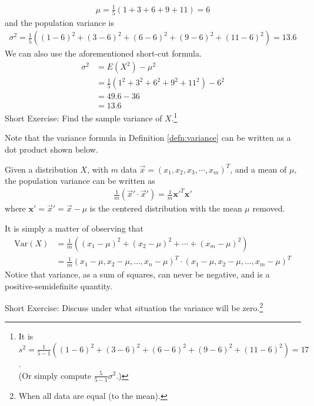 \begin{align*}
\mu = \frac{1}{5}(1 + 3 + 6 + 9 + 11) = 6
\end{align*}
and the population variance is
\begin{align*}
\sigma^2 = \frac{1}{5}((1-6)^2 + (3-6)^2 + (6-6)^2 + (9-6)^2 + (11-6)^2) = 13.6
\end{align*}
We can also use the aforementioned short-cut formula.
\begin{align*}
\sigma^2 &= E(X^2) - \mu^2 \\
&= \frac{1}{5} (1^2 + 3^2 + 6^2 + 9^2 + 11^2) - 6^2 \\
&= 49.6 - 36 \\
&= 13.6
\end{align*}
Short Exercise: Find the sample variance of $X$.\footnote{It is $s^2 = \frac{1}{5-1}((1-6)^2 + (3-6)^2 + (6-6)^2 + (9-6)^2 + (11-6)^2) = 17$.\\(Or simply compute $\frac{5}{5-1}\sigma^2$.)} \par
Note that the variance formula in Definition \ref{defn:variance} can be written as a dot product shown below.
\begin{proper}
Given a distribution $X$, with $m$ data $\vec{x} = (x_1, x_2, x_3, \cdots, x_m)^T$, and a mean of $\mu$, the population variance can be written as
\begin{align*}
\frac{1}{m} (\vec{x}'\cdot\vec{x}') = \frac{1}{m} \textbf{x}'^T \textbf{x}'
\end{align*}
where $\textbf{x}' = \vec{x}' = \vec{x} - \mu$ is the centered distribution with the mean $\mu$ removed.
\end{proper}
It is simply a matter of observing that 
\begin{align*}
\text{Var}(X) &= \frac{1}{m} ((x_1 - \mu)^2 + (x_2 - \mu)^2 + \cdots + (x_m - \mu)^2) \\ &= \frac{1}{m} (x_1 - \mu, x_2 - \mu, \ldots, x_n - \mu)^T \cdot (x_1 - \mu, x_2 - \mu, \ldots, x_m - \mu)^T    
\end{align*}
Notice that variance, as a sum of squares, can never be negative, and is a positive-semidefinite quantity. \par
Short Exercise: Discuss under what situation the variance will be zero.\footnote{When all data are equal (to the mean).}

